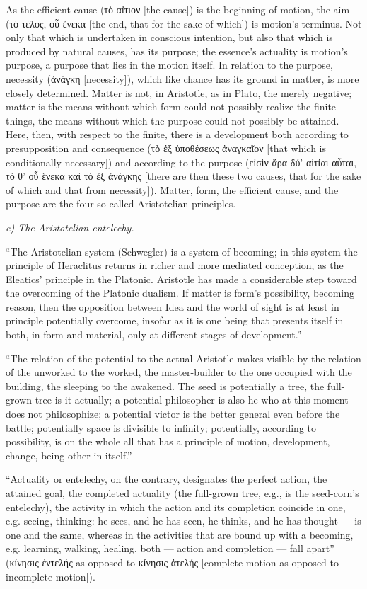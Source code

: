 \documentclass[12pt]{book}
\begin{document}
As the efficient cause (τὸ αἴτιον [the cause]) is the beginning of motion, the aim (τὸ τέλος, οὗ
ἕνεκα [the end, that for the sake of which]) is motion's terminus. Not only that which is undertaken
in conscious intention, but also that which is produced by natural causes, has its purpose; the
essence's actuality is motion's purpose, a purpose that lies in the motion itself. In relation to
the purpose, necessity (ἀνάγκη [necessity]), which like chance has its ground in matter, is more
closely determined. Matter is not, in Aristotle, as in Plato, the merely negative; matter is the
means without which form could not possibly realize the finite things, the means without which the
purpose could not possibly be attained. Here, then, with respect to the finite, there is a
development both according to presupposition and consequence (τὸ ἐξ ὑποθέσεως ἀναγκαῖον [that which
is conditionally necessary]) and according to the purpose (εἰσὶν ἄρα δύ' αἰτίαι αὗται, τό θ' οὗ
ἕνεκα καὶ τὸ ἐξ ἀνάγκης [there are then these two causes, that for the sake of which and that from
necessity]). Matter, form, the efficient cause, and the purpose are the four so-called Aristotelian
principles.

\emph{c) The Aristotelian entelechy.}

``The Aristotelian system (Schwegler) is a system of becoming; in this system the principle of
Heraclitus returns in richer and more mediated conception, as the Eleatics' principle in the
Platonic. Aristotle has made a considerable step toward the overcoming of the Platonic dualism. If
matter is form's possibility, becoming reason, then the opposition between Idea and the world of
sight is at least in principle potentially overcome, insofar as it is one being that presents itself
in both, in form and material, only at different stages of development.''

``The relation of the potential to the actual Aristotle makes visible by the relation of the
unworked to the worked, the master-builder to the one occupied with the building, the sleeping to
the awakened. The seed is potentially a tree, the full-grown tree is it actually; a potential
philosopher is also he who at this moment does not philosophize; a potential victor is the better
general even before the battle; potentially space is divisible to infinity; potentially, according
to possibility, is on the whole all that has a principle of motion, development, change,
being-other in itself.''

``Actuality or entelechy, on the contrary, designates the perfect action, the attained goal, the
completed actuality (the full-grown tree, e.g., is the seed-corn's entelechy), the activity in which
the action and its completion coincide in one, e.g. seeing, thinking: he sees, and he has seen, he
thinks, and he has thought — is one and the same, whereas in the activities that are bound up with a
becoming, e.g. learning, walking, healing, both — action and completion — fall apart'' (κίνησις
ἐντελής as opposed to κίνησις ἀτελής [complete motion as opposed to incomplete motion]).
\end{document}
